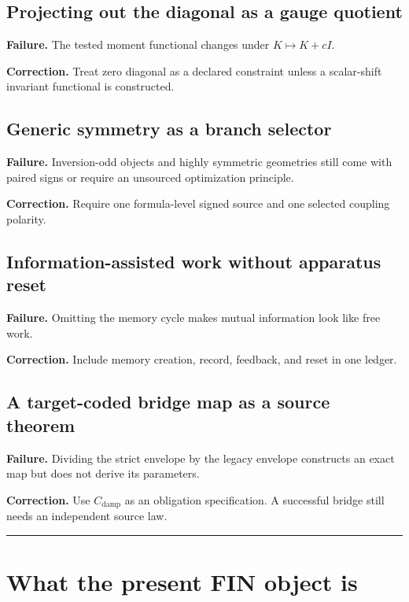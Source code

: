 \documentclass[11pt,a4paper,openany]{report}
\begin{document}
\section{Projecting out the diagonal as a gauge quotient}

\textbf{Failure.} The tested moment functional changes under \(K\mapsto K+cI\).

\textbf{Correction.} Treat zero diagonal as a declared constraint unless a scalar-shift invariant functional is constructed.

\section{Generic symmetry as a branch selector}

\textbf{Failure.} Inversion-odd objects and highly symmetric geometries still come with paired signs or require an unsourced optimization principle.

\textbf{Correction.} Require one formula-level signed source and one selected coupling polarity.

\section{Information-assisted work without apparatus reset}

\textbf{Failure.} Omitting the memory cycle makes mutual information look like free work.

\textbf{Correction.} Include memory creation, record, feedback, and reset in one ledger.

\section{A target-coded bridge map as a source theorem}

\textbf{Failure.} Dividing the strict envelope by the legacy envelope constructs an exact map but does not derive its parameters.

\textbf{Correction.} Use \(C_{\mathrm{damp}}\) as an obligation specification. A successful bridge still needs an independent source law.

\par\medskip\hrule\medskip

\chapter{What the present FIN object is}
\end{document}
